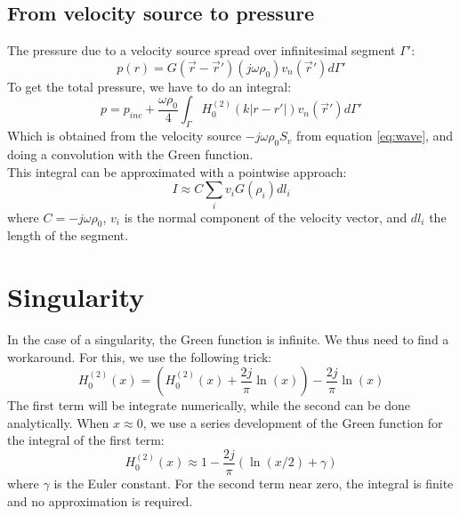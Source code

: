 \documentclass[12pt, openany]{report}
\theoremstyle{definition}
\begin{document}
\subsection{From velocity source to pressure}\label{sec:pressure}
The pressure due to a velocity source spread over infinitesimal segment $\Gamma'$:
\begin{equation}
  p(r) = G(\vec r-\vec r') (j\omega \rho_0) v_n(\vec r')d\Gamma'
\end{equation}
To get the total pressure, we have to do an integral:
\begin{equation}\label{eq:pressure}
  p = p_{inc} + \frac{\omega \rho_0}{4} \int_\Gamma H_0^{(2)}(k|r-r'|)v_n(\vec r')d\Gamma'  
\end{equation}
Which is obtained from the velocity source $-j\omega \rho_0S_v$ from equation \eqref{eq:wave}, and doing a convolution with the Green function. \\

This integral can be approximated with a pointwise approach:
\begin{equation}
  I\approx C\sum_i v_iG(\rho_i)dl_i
\end{equation}
where $C=-j\omega\rho_0$, $v_i$ is the normal component of the velocity vector, and $dl_i$ the length of the segment.  
\section{Singularity}
In the case of a singularity, the Green function is infinite. We thus need to find a workaround. For this, we use the following trick:
\begin{equation}
    H_0^{(2)}(x) = \left(H_0^{(2)}(x) + \frac{2j}{\pi}\ln(x)\right) - \frac{2j}{\pi}\ln(x)
\end{equation}
The first term will be integrate numerically, while the second can be done analytically. When $x\approx 0$, we use a series development of the Green function for the integral of the first term:
\begin{equation}
    H_0^{(2)}(x) \approx 1-\frac{2j}{\pi}\left(\ln(x/2)+\gamma\right)
\end{equation}
where $\gamma$ is the Euler constant. For the second term near zero, the integral is finite and no approximation is required.
\end{document}

